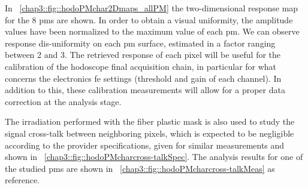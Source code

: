 In \figurename~\ref{chap3::fig::hodoPMchar2Dmaps_allPM} the two-dimensional response map for the 8 \glspl{pm} are shown. In order to obtain a visual uniformity, the amplitude values have been normalized to the maximum value of each \gls{pm}. We can observe response dis-uniformity on each \gls{pm} surface, estimated in a factor ranging between 2 and 3. The retrieved response of each pixel will be useful for the calibration of the hodoscope final acquisition chain, in particular for what concerns the electronics \gls{fe} settings (threshold and gain of each channel). In addition to this, these calibration measurements will allow for a proper data correction at the analysis stage.

The irradiation performed with the fiber plastic mask is also used to study the signal cross-talk between neighboring pixels, which is expected to be negligible according to the provider specifications, given for similar measurements and shown in \figurename~\ref{chap3::fig::hodoPMcharcross-talkSpec}. The analysis results for one of the studied \glspl{pm} are shown in \figurename~\ref{chap3::fig::hodoPMcharcross-talkMeas} as reference.
      
